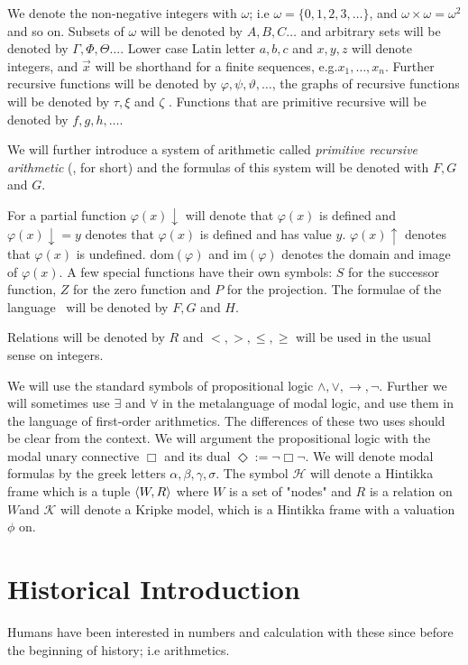 \documentclass[../main.tex]{subfiles}
\begin{document}
We denote the non-negative integers with $\omega$; i.e
$\omega=\{0,1,2,3,\ldots\}$, and $\omega\times\omega=\omega^2$ and so on.
Subsets of $\omega$ will be denoted by $A,B,C\ldots$ and arbitrary sets will be
denoted by
$\Gamma,\Phi,\Theta\ldots$. Lower case Latin letter $a,b,c$ and $x,y,z$ will
denote integers, and $\vec{x}$ will be shorthand for a finite sequences, e.g.$x_1,\ldots,x_n$. Further recursive functions will be denoted by
$\varphi,\psi,\vartheta,\ldots$, the graphs of recursive functions will be
denoted by $\tau,\xi$ and $\zeta$ . Functions that are primitive recursive will be denoted by
$f,g,h,\ldots$. 

We will further introduce a system of arithmetic called \textit{primitive
recursive arithmetic} (\PRA, for short) and the formulas of this
system will be denoted with $F,G$ and $G$.

For a partial function $\varphi(x)\downarrow$ will denote that $\varphi(x)$ is defined and
$\varphi(x)\downarrow=y$ denotes that $\varphi(x)$ is defined and has value $y$.
$\varphi(x)\uparrow$
denotes that $\varphi(x)$ is undefined. $\text{dom}(\varphi)$ and $\text{im}
(\varphi)$ denotes the
domain and image of $\varphi(x)$.
A few special functions have their own symbols: $S$ for the
successor function, $Z$ for the zero function and $P$ for the projection.
The formulae of the language \PRA\ will be denoted by $F,G$ and $H$.

Relations will be denoted by $R$ and $<,>,\leq,\geq$ will be used in the usual
sense on integers.

We will use the standard symbols of propositional  logic
$\wedge,\vee,\rightarrow,\neg$. Further we will sometimes use $\exists$ and
$\forall$ in the metalanguage of modal logic, and use them in the language of
first-order arithmetics. The differences of these two uses should be clear
from the context. We will argument the propositional logic with the modal unary
connective $\Box$ and its dual $\Diamond:=\neg\Box\neg$. We will denote modal
formulas by the greek letters $\alpha,\beta,\gamma,\sigma$. The symbol
$\mathcal{H}$ will denote a
Hintikka frame  which is a tuple $\langle W,R\rangle$ where $W$ is a set of "nodes" and
$R$ is a relation on $W$and
$\mathcal{K}$ will denote a Kripke model, which is a Hintikka frame with a
valuation $\phi$ on.

\section{Historical Introduction}
Humans have been interested in numbers and calculation with these since before
the beginning of history; i.e arithmetics. 
\end{document}
